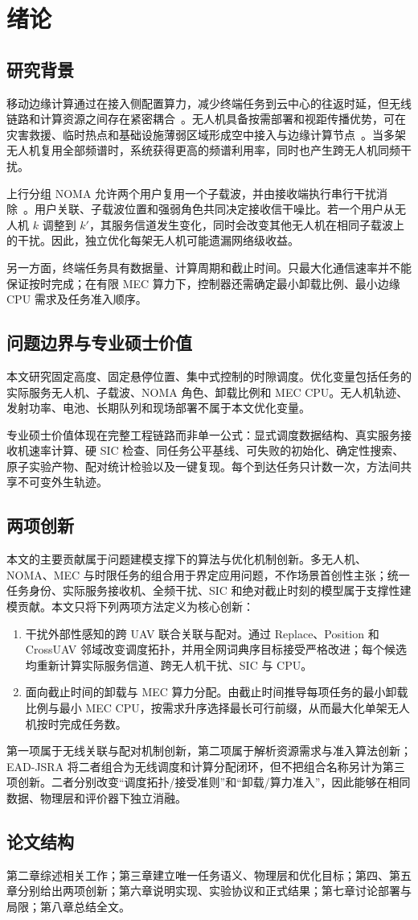 \chapter{绪论}
\section{研究背景}
移动边缘计算通过在接入侧配置算力，减少终端任务到云中心的往返时延，但无线链路和计算资源之间存在紧密耦合~\cite{mao2017survey}。无人机具备按需部署和视距传播优势，可在灾害救援、临时热点和基础设施薄弱区域形成空中接入与边缘计算节点~\cite{zeng2016uav,alhourani2014optimal}。当多架无人机复用全部频谱时，系统获得更高的频谱利用率，同时也产生跨无人机同频干扰。

上行分组 NOMA 允许两个用户复用一个子载波，并由接收端执行串行干扰消除~\cite{ding2017survey}。用户关联、子载波位置和强弱角色共同决定接收信干噪比。若一个用户从无人机 $k$ 调整到 $k'$，其服务信道发生变化，同时会改变其他无人机在相同子载波上的干扰。因此，独立优化每架无人机可能遗漏网络级收益。

另一方面，终端任务具有数据量、计算周期和截止时间。只最大化通信速率并不能保证按时完成；在有限 MEC 算力下，控制器还需确定最小卸载比例、最小边缘 CPU 需求及任务准入顺序。

\section{问题边界与专业硕士价值}
本文研究固定高度、固定悬停位置、集中式控制的时隙调度。优化变量包括任务的实际服务无人机、子载波、NOMA 角色、卸载比例和 MEC CPU。无人机轨迹、发射功率、电池、长期队列和现场部署不属于本文优化变量。

专业硕士价值体现在完整工程链路而非单一公式：显式调度数据结构、真实服务接收机速率计算、硬 SIC 检查、同任务公平基线、可失败的初始化、确定性搜索、原子实验产物、配对统计检验以及一键复现。每个到达任务只计数一次，方法间共享不可变外生轨迹。

\section{两项创新}
本文的主要贡献属于问题建模支撑下的算法与优化机制创新。多无人机、NOMA、MEC 与时限任务的组合用于界定应用问题，不作场景首创性主张；统一任务身份、实际服务接收机、全频干扰、SIC 和绝对截止时刻的模型属于支撑性建模贡献。本文只将下列两项方法定义为核心创新：
\begin{enumerate}
 \item 干扰外部性感知的跨 UAV 联合关联与配对。通过 Replace、Position 和 CrossUAV 邻域改变调度拓扑，并用全网词典序目标接受严格改进；每个候选均重新计算实际服务信道、跨无人机干扰、SIC 与 CPU。
 \item 面向截止时间的卸载与 MEC 算力分配。由截止时间推导每项任务的最小卸载比例与最小 MEC CPU，按需求升序选择最长可行前缀，从而最大化单架无人机按时完成任务数。
\end{enumerate}
第一项属于无线关联与配对机制创新，第二项属于解析资源需求与准入算法创新；EAD-JSRA 将二者组合为无线调度和计算分配闭环，但不把组合名称另计为第三项创新。二者分别改变“调度拓扑/接受准则”和“卸载/算力准入”，因此能够在相同数据、物理层和评价器下独立消融。

\section{论文结构}
第二章综述相关工作；第三章建立唯一任务语义、物理层和优化目标；第四、第五章分别给出两项创新；第六章说明实现、实验协议和正式结果；第七章讨论部署与局限；第八章总结全文。
